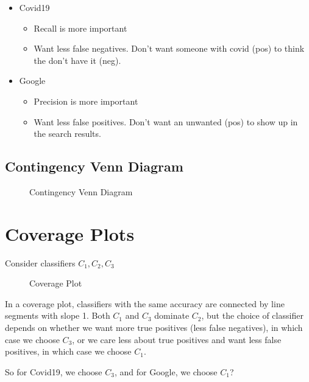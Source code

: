 \begin{itemize}
  \item Covid19 
    \begin{itemize}
      \item Recall is more important 
      \item Want less false negatives. Don't want someone with covid (pos) to
        think the don't have it (neg).
    \end{itemize}
  \item Google
    \begin{itemize}
      \item Precision is more important
      \item Want less false positives. Don't want an unwanted (pos) to show up
        in the search results.
    \end{itemize}
\end{itemize}

\subsection{Contingency Venn Diagram}%

\begin{figure}[ht]
    \centering
    \caption{Contingency Venn Diagram}
    \label{fig:contingency-venn-diagram}
\end{figure}

\section{Coverage Plots}%

Consider classifiers $C_1, C_2, C_3$

\begin{figure}[ht]
    \centering
    \caption{Coverage Plot}
    \label{fig:coverage-plot}
\end{figure}

In a coverage plot, classifiers with the same accuracy are connected by line
segments with slope 1. Both $C_1$ and $C_3$ dominate $C_2$, but the choice of
classifier depends on whether we want more true positives (less false
negatives), in which case we choose $C_3$, or we care less about true
positives and want less false positives, in which case we choose $C_1$.

So for Covid19, we choose $C_3$, and for Google, we choose $C_1$?

